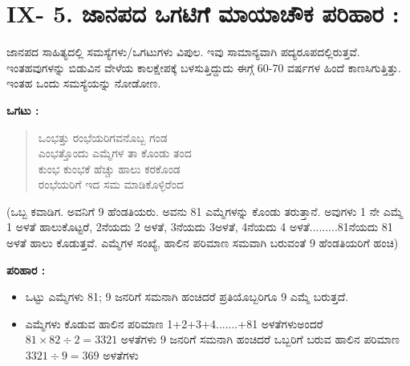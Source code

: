 \section*{IX- 5. ಜಾನಪದ ಒಗಟಿಗೆ ಮಾಯಾಚೌಕ ಪರಿಹಾರ :}

ಜಾನಪದ ಸಾಹಿತ್ಯದಲ್ಲಿ ಸಮಸ್ಯೆಗಳು/ಒಗಟುಗಳು ವಿಪುಲ. ಇವು ಸಾಮಾನ್ಯವಾಗಿ ಪದ್ಯ\-ರೂಪದಲ್ಲಿರುತ್ತವೆ. ಇಂತಹವುಗಳನ್ನು ಬಿಡುವಿನ ವೇಳೆಯ ಕಾಲಕ್ಷೇಪಕ್ಕೆ ಬಳಸುತ್ತಿದ್ದುದು ಈಗ್ಗೆ 60-70 ವರ್ಷಗಳ ಹಿಂದೆ ಕಾಣಸಿಗುತ್ತಿತ್ತು. ಇಂತಹ ಒಂದು ಸಮಸ್ಯೆಯನ್ನು ನೋಡೋಣ.

\smallskip

\textbf{ಒಗಟು :} 
\begin{quote}
ಒಂಭತ್ತು ರಂಭೆಯರಿಗವನೊಬ್ಬ ಗಂಡ\\
ಎಂಭತ್ತೊಂದು ಎಮ್ಮೆಗಳ ತಾ ಕೊಂಡು ತಂದ\\
ಕುಂಭ ಕುಂಭಕೆ ಹೆಚ್ಚು ಹಾಲು ಕರಕೊಂಡ\\
ರಂಭೆಯರಿಗೆ ಇದ ಸಮ ಮಾಡಿಕೊಳ್ಳಿರೆಂದ
\end{quote}
(ಒಬ್ಬ ಕವಾಡಿಗ. ಅವನಿಗೆ 9 ಹೆಂಡತಿಯರು. ಅವನು 81 ಎಮ್ಮೆಗಳನ್ನು ಕೊಂಡು ತರುತ್ತಾನೆ. ಅವುಗಳು 1 ನೇ ಎಮ್ಮೆ 1 ಅಳತೆ ಹಾಲುಕೊಟ್ಟರೆ, 2ನೆಯದು 2 ಅಳತೆ, 3ನೆಯದು 3ಅಳತೆ, 4ನೆಯದು 4 ಅಳತೆ.........81ನೆಯದು 81 ಅಳತೆ ಹಾಲು ಕೊಡುತ್ತವೆ. ಎಮ್ಮೆಗಳ ಸಂಖ್ಯೆ, ಹಾಲಿನ ಪರಿಮಾಣ ಸಮವಾಗಿ ಬರುವಂತೆ 9 ಹೆಂಡತಿಯರಿಗೆ ಹಂಚಿ)

\smallskip
\textbf{ಪರಿಹಾರ :}
\begin{itemize}
	\item ಒಟ್ಟು ಎಮ್ಮೆಗಳು 81; 9 ಜನರಿಗೆ ಸಮನಾಗಿ ಹಂಚಿದರೆ ಪ್ರತಿಯೊಬ್ಬರಿಗೂ 9 ಎಮ್ಮೆ ಬರುತ್ತದೆ.
	\item ಎಮ್ಮೆಗಳು ಕೊಡುವ ಹಾಲಿನ ಪರಿಮಾಣ 1+2+3+4.......+81 ಅಳತೆಗಳು\break ಅಂದರೆ $81 \times 82\div 2 = 3321$ ಅಳತೆಗಳು 9 ಜನರಿಗೆ ಸಮನಾಗಿ ಹಂಚಿ\-ದರೆ ಒಬ್ಬರಿಗೆ ಬರುವ ಹಾಲಿನ ಪರಿಮಾಣ $3321 \div 9 = 369$ ಅಳತೆಗಳು
\end{itemize}

